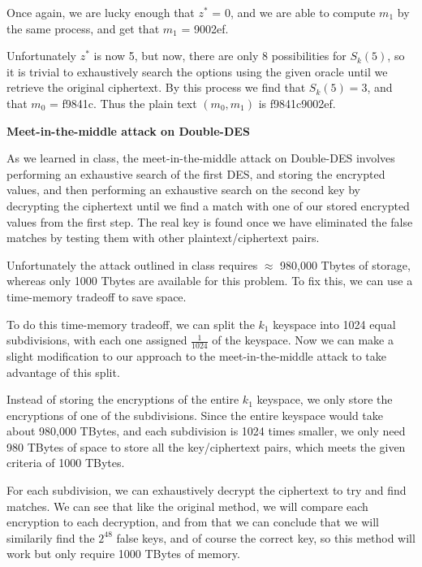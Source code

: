 \documentclass[12pt]{article}
\begin{document}
\begin{list}{.}{}
\begin{list}{)}{}
Once again, we are lucky enough that $z^*$ = 0, and we are able to compute
$m_1$ by the same process, and get that $m_1$ = 9002ef.

Unfortunately $z^*$ is now 5, but now, there are only 8 possibilities for
$S_k(5)$, so it is trivial to exhaustively search the options using the given
oracle until we retrieve the original ciphertext.  By this process we find that
$S_k(5) = 3$, and that $m_0$ = f9841c.  Thus the plain text $(m_0, m_1)$ is
f9841c9002ef.

\end{list}

\item \textbf{Meet-in-the-middle attack on Double-DES}
\begin{list}{)}{}

\item As we learned in class, the meet-in-the-middle attack on Double-DES
involves performing an exhaustive search of the first DES, and storing the
encrypted values, and then performing an exhaustive search on the second key by
decrypting the ciphertext until we find a match with one of our stored encrypted
values from the first step.  The real key is found once we have eliminated the
false matches by testing them with other plaintext/ciphertext pairs.

Unfortunately the attack outlined in class requires $\approx$ 980,000 Tbytes of
storage, whereas only 1000 Tbytes are available for this problem.  To fix this,
we can use a time-memory tradeoff to save space.

To do this time-memory tradeoff, we can split the $k_1$ keyspace into 1024 equal
subdivisions, with each one assigned $\frac{1}{1024}$ of the keyspace.  Now we
can make a slight modification to our approach to the meet-in-the-middle attack
to take advantage of this split.

Instead of storing the encryptions of the entire $k_1$ keyspace, we only store
the encryptions of one of the subdivisions.  Since the entire keyspace would
take about 980,000 TBytes, and each subdivision is 1024 times smaller, we only
need 980 TBytes of space to store all the key/ciphertext pairs, which meets the
given criteria of 1000 TBytes.

For each subdivision, we can exhaustively decrypt the ciphertext to try and find
matches.  We can see that like the original method, we will compare each
encryption to each decryption, and from that we can conclude that we will
similarily find the $2^{48}$ false keys, and of course the correct key, so this
method will work but only require 1000 TBytes of memory.


\end{list}
\end{list}
\end{document}
